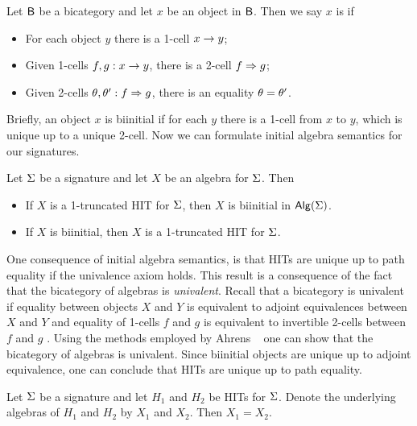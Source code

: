 \begin{definition}
Let $\mathsf{B}$ be a bicategory and let $x$ be an object in $\mathsf{B}$.
Then we say $x$ is  if
\begin{itemize}
	\item For each object $y$ there is a 1-cell $x \rightarrow y$;
	\item Given 1-cells $f, g : x \rightarrow y$, there is a 2-cell $f \Rightarrow g$;
	\item Given 2-cells $\theta, \theta' : f \Rightarrow g$, there is an equality $\theta = \theta'$.
\end{itemize}
\end{definition}

Briefly, an object $x$ is biinitial if for each $y$ there is a 1-cell from $x$ to $y$, which is unique up to a unique 2-cell.
Now we can formulate initial algebra semantics for our signatures.

\begin{proposition}
\label{thm:initial_alg_sem}
Let $\Sigma$ be a signature and let $X$ be an algebra for $\Sigma$.
Then
\begin{itemize}
	\item If $X$ is a 1-truncated HIT for $\Sigma$, then $X$ is biinitial in $\mathsf{Alg}(\Sigma)$.
	\item If $X$ is biinitial, then $X$ is a 1-truncated HIT for $\Sigma$.
\end{itemize}
\end{proposition}

One consequence of initial algebra semantics, is that HITs are unique up to path equality if the univalence axiom holds.
This result is a consequence of the fact that the bicategory of algebras is \emph{univalent}.
Recall that a bicategory is univalent if
equality between objects $X$ and $Y$ is equivalent to adjoint equivalences between $X$ and $Y$
and equality of 1-cells $f$ and $g$ is equivalent to invertible 2-cells between $f$ and $g$
\cite{bicatjournal}.
Using the methods employed by Ahrens \etal \ \cite{bicatjournal} one can show that the bicategory of algebras
is univalent.
Since biinitial objects are unique up to adjoint equivalence, one can conclude that HITs are unique up
to path equality.

\begin{proposition}
Let $\Sigma$ be a signature and let $H_1$ and $H_2$ be HITs for $\Sigma$.
Denote the underlying algebras of $H_1$ and $H_2$ by $X_1$ and $X_2$.
Then $X_1 = X_2$.
\end{proposition}
